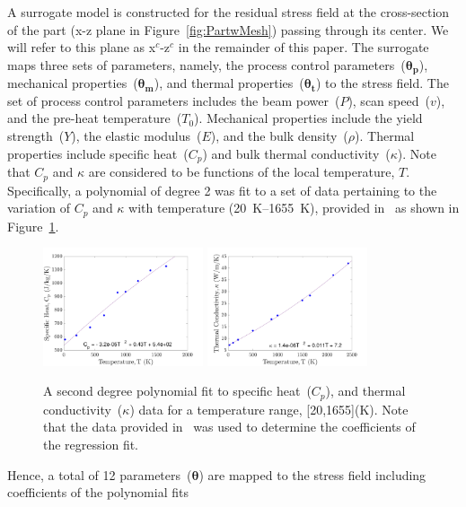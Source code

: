 A surrogate model is constructed for the residual stress field at the cross-section of the part 
(x-z plane in Figure~\ref{fig:PartwMesh}) passing through its center. We will refer to this plane
as x$^c$-z$^c$ in the remainder of this paper. The surrogate maps three sets of
parameters, namely, the process control parameters~($\bm{\theta_p}$), mechanical properties~($\bm{\theta_m}$),
and thermal properties~($\bm{\theta_t}$) to the stress field. The set of process control parameters includes
the beam power~($P$), scan speed~($v$), and the pre-heat temperature~($T_0$). Mechanical properties
include the yield strength~($Y$), the elastic modulus~($E$), and the bulk density~($\rho$). Thermal 
properties include specific heat~($C_p$) and bulk thermal conductivity~($\kappa$). Note that $C_p$ and $\kappa$
are considered to be functions of the local temperature, $T$. Specifically, a polynomial of degree 2 was fit
to a set of data pertaining to the variation of $C_p$ and $\kappa$ with temperature (20~K--1655~K), 
provided in~\cite{Fu:2014} as shown in Figure~\ref{fig:Cp_kappa}.
%
\begin{figure}[htbp]
\begin{center}
\includegraphics[width=0.42\textwidth]{./Figures/cp_fit}
\includegraphics[width=0.42\textwidth]{./Figures/kappa_fit}
\end{center}
\caption{A second degree polynomial fit to specific heat~($C_p$), and thermal conductivity~($\kappa$) data
for a temperature range, [20,1655](K). Note that the data provided in~\cite{Fu:2014} was used to determine
the coefficients of the regression fit.}
\label{fig:Cp_kappa}
\end{figure}
%
Hence, a total of 12 parameters~($\bm{\theta}$) are mapped to the stress field including coefficients of the polynomial fits
